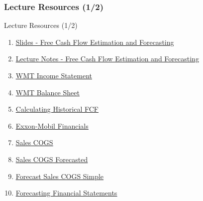 \documentclass[handout, 11pt]{beamer}
\begin{document}
\begin{frame}
\frametitle{Lecture Resources (1/2)}
{
\begin{block}{Lecture Resources (1/2)}
\begin{enumerate}
\item \textcolor{blue}{\underline{\href{https://nickderobertis.github.io/fin-model-course/\_static/generated/pdfs/S12 Free Cash Flow Estimation and Forecasting.pdf}{Slides - Free Cash Flow Estimation and Forecasting}}}
\item \textcolor{blue}{\underline{\href{https://nickderobertis.github.io/fin-model-course/\_static/generated/pdfs/LN12 Free Cash Flow Estimation and Forecasting.pdf}{Lecture Notes - Free Cash Flow Estimation and Forecasting}}}
\item \textcolor{blue}{\underline{\href{https://nickderobertis.github.io/fin-model-course/\_static/Materials for Lab Exercises/DCF/FCF/WMT Income Statement.xlsx}{WMT Income Statement}}}
\item \textcolor{blue}{\underline{\href{https://nickderobertis.github.io/fin-model-course/\_static/Materials for Lab Exercises/DCF/FCF/WMT Balance Sheet.xlsx}{WMT Balance Sheet}}}
\item \textcolor{blue}{\underline{\href{https://nickderobertis.github.io/fin-model-course/\_static/Examples/DCF/Historical FCF/Calculating Historical FCF.ipynb}{Calculating Historical FCF}}}
\item \textcolor{blue}{\underline{\href{https://nickderobertis.github.io/fin-model-course/\_static/Examples/DCF/Historical FCF/Exxon Mobil Corporation NYSE XOM Financials.xls}{Exxon-Mobil Financials}}}
\item \textcolor{blue}{\underline{\href{https://nickderobertis.github.io/fin-model-course/\_static/Examples/DCF/Forecasting/Simple/Sales COGS.xlsx}{Sales COGS}}}
\item \textcolor{blue}{\underline{\href{https://nickderobertis.github.io/fin-model-course/\_static/Examples/DCF/Forecasting/Simple/Sales COGS Forecasted.xlsx}{Sales COGS Forecasted}}}
\item \textcolor{blue}{\underline{\href{https://nickderobertis.github.io/fin-model-course/\_static/Examples/DCF/Forecasting/Simple/Forecast Sales COGS Simple.ipynb}{Forecast Sales COGS Simple}}}
\item \textcolor{blue}{\underline{\href{https://nickderobertis.github.io/fin-model-course/\_static/Examples/DCF/Forecasting/Simple/Forecasting Financial Statements.ipynb}{Forecasting Financial Statements}}}
\end{enumerate}
\vfill
\end{block}
}
\label{frames:resources}
\end{frame}
\end{document}
